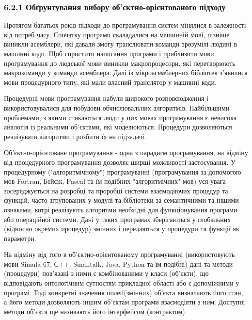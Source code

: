\hypertarget{ux43eux431ux491ux440ux443ux43dux442ux443ux432ux430ux43dux43dux44f-ux432ux438ux431ux43eux440ux443-ux43eux431ux454ux43aux442ux43dux43e-ux43eux440ux456ux454ux43dux442ux43eux432ux430ux43dux43eux433ux43e-ux43fux456ux434ux445ux43eux434ux443}{%
\subsubsection{6.2.1 Обґрунтування вибору об'єктно-орієнтованого
підходу}\label{ux43eux431ux491ux440ux443ux43dux442ux443ux432ux430ux43dux43dux44f-ux432ux438ux431ux43eux440ux443-ux43eux431ux454ux43aux442ux43dux43e-ux43eux440ux456ux454ux43dux442ux43eux432ux430ux43dux43eux433ux43e-ux43fux456ux434ux445ux43eux434ux443}}

Протягом багатьох років підходи до програмування систем мінялися в
залежності від потреб часу. Спочатку програми скаладалися на машинній
мові, пізніше виникли асемблери, які давали змогу транслювати команди
зрозумілі людині в машинні коди. Щоб спростити написання програми і
приблизити мови програмування до людської мови виникли макропроцесори,
які перетворюють макрокоманди у команди асемблера. Далі із
мікроасемблерних бібліотек з'явилися мови процедурного типу, які мали
власний транслятор у машинні коди.

Процедурні мови програмування набули широкого розповсюдження і
використовувалися для побудови обчислювальних алгоритмів. Найбільшими
проблемами, з якими стикаються люди у цих мовах програмування є невисока
аналогія із реальними об'єктами, які моделюються. Процедури дозволяються
реалізувати алгоритми і розбити їх на підзадачі.

Об'єктно-орієнтоване програмування - одна з парадигм програмування, на
відміну від процедурного програмування дозволяє ширші можливості
застосування. У процедурному ("алгоритмічному") програмуванні
(програмування за допомогою мов Fortran, Бейсік, Pascal та їм подібних
"алгоритмічних" мов) уся увага зосереджується на розробці та проробці
системи взаємодіючих процедур та функцій, часто згрупованих у модулі та
бібліотеки за семантичними та іншими ознаками, котрі реалізують
алгоритми необхідні для функціонування програми або операційної системи.
Дані у таких програмах зберігаються у глобальних (відносно окремих
процедур) змінних і передаються у процедури та функції як параметри.

На відміну від того в об'єктно-орієнтованому програмуванні
(використовують мови Simula-67, С++, Smalltalk, Java, Python та їм
подібні) дані та методи (процедури) пов'язані з ними є комбінованими у
класи (об'єкти), що відповідають онтологічним сутностям прикладної
області або є допоміжними у програмі. Тоді конкретні значення
полей(змінних) об'єкта визначають його стан, а його методи дозволяють
іншим об'єктам програми взаємодіяти з ним. Доступні методи об'єкта ще
називають його інтерфейсом (контрактом).

